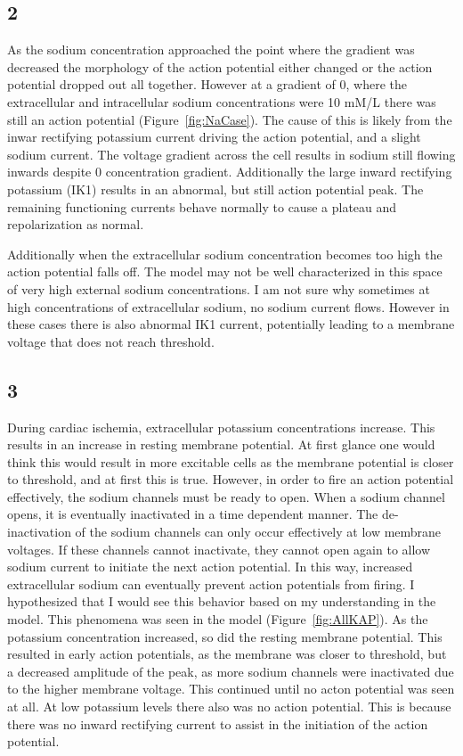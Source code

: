 \documentclass[12pt]{article}
\begin{document}
\subsection{2}
\par{}
As the sodium concentration approached the point where the gradient was decreased the morphology of the action potential either changed or the action potential dropped out all together. However at a gradient of 0, where the extracellular and intracellular sodium concentrations were 10 mM/L there was still an action potential (Figure~\ref{fig:NaCase}). The cause of this is likely from the inwar rectifying potassium current driving the action potential, and a slight sodium current. The voltage gradient across the cell results in sodium still flowing inwards despite 0 concentration gradient. Additionally the large inward rectifying potassium (IK1) results in an abnormal, but still action potential peak. The remaining functioning currents behave normally to cause a plateau and repolarization as normal.
\par{}
Additionally when the extracellular sodium concentration becomes too high the action potential falls off. The model may not be well characterized in this space of very high external sodium concentrations. I am not sure why sometimes at high concentrations of extracellular sodium, no sodium current flows. However in these cases there is also abnormal IK1 current, potentially leading to a membrane voltage that does not reach threshold.

\subsection{3}
\par{}
During cardiac ischemia, extracellular potassium concentrations increase. This results in an increase in resting membrane potential. At first glance one would think this would result in more excitable cells as the membrane potential is closer to threshold, and at first this is true. However, in order to fire an action potential effectively, the sodium channels must be ready to open. When a sodium channel opens, it is eventually inactivated in a time dependent manner. The de-inactivation of the sodium channels can only occur effectively at low membrane voltages. If these channels cannot inactivate, they cannot open again to allow sodium current to initiate the next action potential. In this way, increased extracellular sodium can eventually prevent action potentials from firing. I hypothesized that I would see this behavior based on my understanding in the model. This phenomena was seen in the model (Figure~\ref{fig:AllKAP}). As the potassium concentration increased, so did the resting membrane potential. This resulted in early action potentials, as the membrane was closer to threshold, but a decreased amplitude of the peak, as more sodium channels were inactivated due to the higher membrane voltage. This continued until no acton potential was seen at all. At low potassium levels there also was no action potential. This is because there was no inward rectifying current to assist in the initiation of the action potential.


\end{document}
